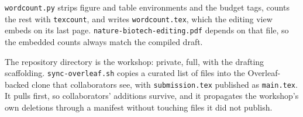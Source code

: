 \texttt{wordcount.py} strips figure and table environments and the budget tags,
counts the rest with \texttt{texcount}, and writes \texttt{wordcount.tex}, which the
editing view embeds on its last page. \texttt{nature-biotech-editing.pdf} depends on that file, so
the embedded counts always match the compiled draft.

The repository directory is the workshop: private, full, with the drafting
scaffolding. \texttt{sync-overleaf.sh} copies a curated list of files into the
Overleaf-backed clone that collaborators see, with \texttt{submission.tex}
published as \texttt{main.tex}. It pulls first, so collaborators' additions
survive, and it propagates the workshop's own deletions through a manifest without
touching files it did not publish.
